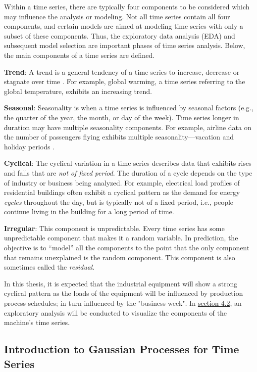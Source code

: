 Within a time series, there are typically four components to be considered which may influence the analysis or modeling. Not all time series contain all four components, and certain models are aimed at modeling time series with only a subset of these components. Thus, the exploratory data analysis (EDA) and subsequent model selection are important phases of time series analysis. Below, the main components of a time series are defined.

\textbf{Trend}: A trend is a general tendency of a time series to increase, decrease or stagnate over time \cite{Applied Time Series Analysis}. For example, global warming, a time series referring to the global temperature, exhibits an increasing trend. 

\textbf{Seasonal}: Seasonality is when a time series is influenced by seasonal factors (e.g., the quarter of the year, the month, or day of the week). Time series longer in duration may have multiple seasonality components. For example, airline data on the number of passengers flying exhibits multiple seasonality—vacation and holiday periods \cite{Applied Time Series Analysis}.

\textbf{Cyclical}: The cyclical variation in a time series describes data that exhibits rises and falls that are \textit{not of fixed period}. The duration of a cycle depends on the type of industry or business being analyzed. For example, electrical load profiles of residential buildings often exhibit a cyclical pattern as the demand for energy \textit{cycles} throughout the day, but is typically not of a fixed period, i.e., people continue living in the building for a long period of time. 

\textbf{Irregular}: This component is unpredictable. Every time series has some unpredictable component that makes it a random variable. In prediction, the objective is to “model” all the components to the point that the only component that remains unexplained is the random component. This component is also sometimes called the \textit{residual}. 

In this thesis, it is expected that the industrial equipment will show a strong cyclical pattern as the loads of the equipment will be influenced by production process schedules; in turn influenced by the "business week". In \hyperlink{section.4.2}{section 4.2}, an exploratory analysis will be conducted to visualize the components of the machine's time series. 


\subsection{Introduction to Gaussian Processes for Time Series}

